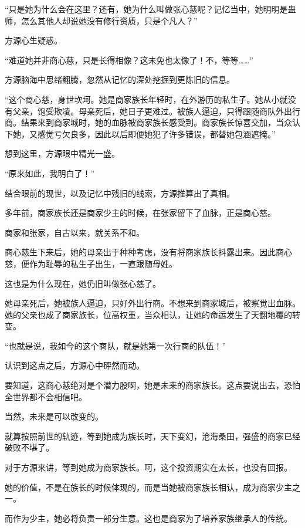 
\begin{this_body}

“只是她为什么会在这里？还有，她为什么叫做张心慈呢？记忆当中，她明明是蛊师，怎么其他人却说她没有修行资质，只是个凡人？”

方源心生疑惑。

“难道她并非商心慈，只是长得相像？这未免也太像了！不，等等……”

方源脑海中思绪翻腾，忽然从记忆的深处挖掘到更陈旧的信息。

“这个商心慈，身世坎坷。她是商家族长年轻时，在外游历的私生子。她从小就没有父亲，饱受欺凌。母亲死后，她日子更难过。被族人逼迫，只得跟随商队外出行商。结果来到商家城时，她的血脉被商家族长感受到。商家族长惊喜交加，当众认下她，又感觉亏欠良多，因此以后即便她犯了许多错误，都替她包涵遮掩。”

想到这里，方源眼中精光一盛。

“原来如此，我明白了！”

结合眼前的现世，以及记忆中残旧的线索，方源推算出了真相。

多年前，商家族长还是商家少主的时候，在张家留下了血脉，正是商心慈。

商家和张家，自古以来，就关系不和。

商心慈生下来后，她的母亲出于种种考虑，没有将商家族长抖露出来。因此商心慈，便作为耻辱的私生子出生，一直跟随母姓。

这也是为什么现在，她仍旧叫做张心慈了。

她母亲死后，她被族人逼迫，只好外出行商。不想来到商家城后，被察觉出血脉。她的父亲也成了商家族长，位高权重，当众相认，让她的命运发生了天翻地覆的转变。

“也就是说，我如今的这个商队，就是她第一次行商的队伍！”

认识到这点之后，方源心中砰然而动。

要知道，这商心慈绝对是个潜力股啊，她是未来的商家族长。这点要说出去，恐怕全世界都不会相信吧。

当然，未来是可以改变的。

就算按照前世的轨迹，等到她成为族长时，天下变幻，沧海桑田，强盛的商家已经破败不堪了。

对于方源来讲，等到她成为商家族长。呵，这个投资期实在太长，也没有回报。

她的价值，不是在族长的时候体现的，而是当她被商家族长相认，成为商家少主之一。

而作为少主，她必将负责一部分生意。这也是商家为了培养家族继承人的传统。


\end{this_body}
